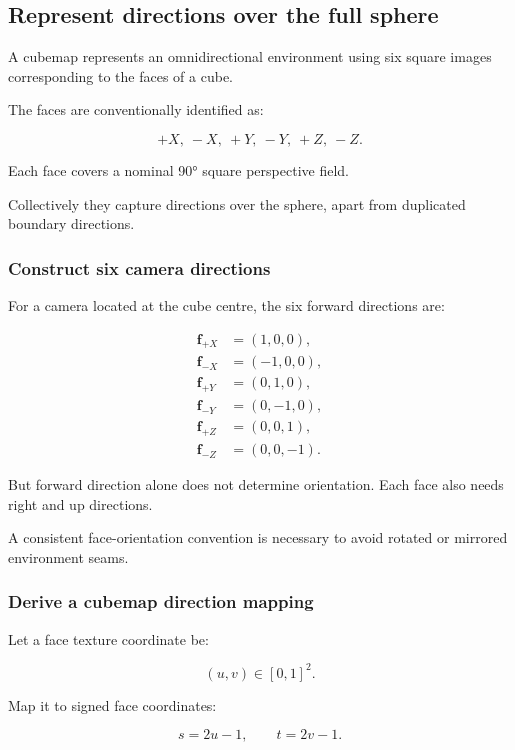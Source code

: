 \subsection{Represent directions over the full sphere}\label{represent-directions-over-the-full-sphere}

A cubemap represents an omnidirectional environment using six square images corresponding to the faces of a cube.

The faces are conventionally identified as:

\[ \boxed{+X,\ -X,\ +Y,\ -Y,\ +Z,\ -Z}. \]

Each face covers a nominal 90° square perspective field.

Collectively they capture directions over the sphere, apart from duplicated boundary directions.

\subsubsection{Construct six camera directions}\label{construct-six-camera-directions}

For a camera located at the cube centre, the six forward directions are:

\[ \begin{aligned} \mathbf f_{+X}&=(1,0,0),\\ \mathbf f_{-X}&=(-1,0,0),\\ \mathbf f_{+Y}&=(0,1,0),\\ \mathbf f_{-Y}&=(0,-1,0),\\ \mathbf f_{+Z}&=(0,0,1),\\ \mathbf f_{-Z}&=(0,0,-1). \end{aligned} \]

But forward direction alone does not determine orientation. Each face also needs right and up directions.

A consistent face-orientation convention is necessary to avoid rotated or mirrored environment seams.

\subsubsection{Derive a cubemap direction mapping}\label{derive-a-cubemap-direction-mapping}

Let a face texture coordinate be:

\[ (u,v)\in[0,1]^2. \]

Map it to signed face coordinates:

\[ s=2u-1, \qquad t=2v-1. \]

